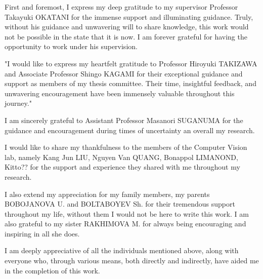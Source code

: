 
\begin{acknowledgments}

First and foremost, I express my deep gratitude to my supervisor Professor Takayuki OKATANI for the immense support and illuminating guidance. Truly, without his guidance and unwavering will to share knowledge, this work would not be possible in the state that it is now. I am forever grateful for having the opportunity to work under his supervision.

"I would like to express my heartfelt gratitude to Professor Hiroyuki TAKIZAWA and Associate Professor Shingo KAGAMI for their exceptional guidance and support as members of my thesis committee. Their time, insightful feedback, and unwavering encouragement have been immensely valuable throughout this journey."

I am sincerely grateful to Assistant Professor Masanori SUGANUMA for the guidance and encouragement during times of uncertainty an overall my research.

I would like to share my thankfulness to the members of the Computer Vision lab, namely Kang Jun LIU, Nguyen Van QUANG, Bonappol LIMANOND, Kitto?? for the support and experience they shared with me throughout my research. 

I also extend my appreciation for my family members, my parents BOBOJANOVA U. and BOLTABOYEV Sh. for their tremendous support throughout my life, without them I would not be here to write this work. I am also grateful to my sister RAKHIMOVA M. for always being encouraging and inspiring in all she does.

I am deeply appreciative of all the individuals mentioned above, along with everyone who, through various means, both directly and indirectly, have aided me in the completion of this work.

\end{acknowledgments}